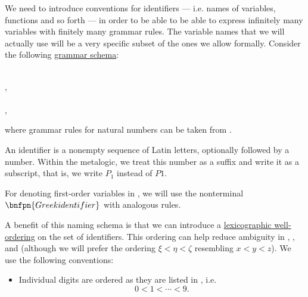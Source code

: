 \begin{remark}\label{rem:grammar_rules_for_variables}
  We need to introduce conventions for identifiers --- i.e. names of variables, functions and so forth --- in order to be able to be able to express infinitely many variables with finitely many grammar rules. The variable names that we will actually use will be a very specific subset of the ones we allow formally. Consider the following \hyperref[def:formal_grammar/schema]{grammar schema}:
  \begin{bnf*}
               { \bnfor {} \bnfor \cdots \bnfor {} \bnfor {} \bnfor {} \bnfor \cdots \bnfor {}} \\
     { \bnfor {} \bnfsp {}}, \\
                 { \bnfor {} \bnfsp {}} \\
           { \bnfor {} \bnfsp {}},
  \end{bnf*}
  where grammar rules for natural numbers can be taken from .

  An identifier is a nonempty sequence of Latin letters, optionally followed by a number. Within the metalogic, we treat this number as a suffix and write it as a subscript, that is, we write \( P_1 \) instead of \( P1 \).

  For denoting first-order variables in , we will use the nonterminal \( \bnfpn{Greek identifier} \) with analogous rules.

  A benefit of this naming schema is that we can introduce a \hyperref[thm:def:well_ordered_set/lexicographic]{lexicographic well-ordering} on the set of identifiers. This ordering can help reduce ambiguity in , ,  and  (although we will prefer the ordering \( \xi < \eta < \zeta \) resembling \( x < y < z \)). We use the following conventions:
  \begin{itemize}
    \item Individual digits are ordered as they are listed in , i.e.
    \begin{equation*}
      0 < 1 < \cdots < 9.
    \end{equation*}


\end{itemize}
\end{remark}

